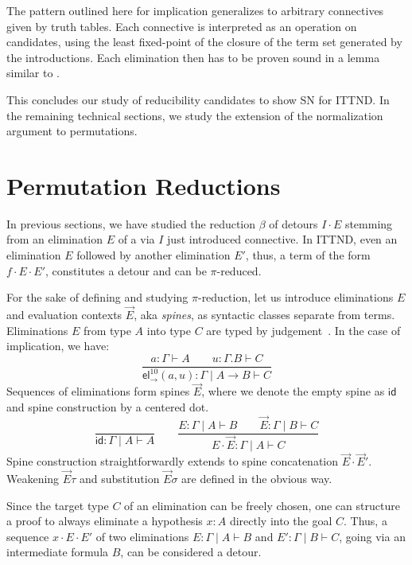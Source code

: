 \documentclass[a4paper,USenglish,cleveref, autoref, thm-restate]{lipics-v2019}
\newcommand{\tid}{\mathsf{id}}
\newcommand{\ru}{\dfrac}
\newcommand{\tel}{\mathsf{el}}
\newcommand{\el}[2]{\ensuremath{\tel_{#1}^{#2}}}
\begin{document}
The pattern outlined here for implication generalizes to arbitrary
connectives given by truth tables.  Each connective is interpreted as
an operation on candidates, using the least fixed-point of the closure
of the term set generated by the introductions.  Each elimination then
has to be proven sound in a lemma similar to .

This concludes our study of reducibility candidates to show SN for ITTND.
In the remaining technical
sections, we study the extension of the normalization argument to
permutations.

\section{Permutation Reductions}
\label{sec:perm}


In previous sections, we have studied the reduction $\beta$ of detours
$I \cdot E$
stemming from an elimination $E$ of a via $I$ just introduced connective.
%
In ITTND, even an elimination $E$ followed by another elimination
$E'$, thus, a term of the form $f \cdot E \cdot E'$, constitutes a
detour and can be $\pi$-reduced.

For the sake of defining and studying $\pi$-reduction, let us
introduce eliminations $E$ and evaluation contexts $\vec E$, aka
\emph{spines}, as syntactic classes separate from terms.  Eliminations
$E$ from type $A$ into type $C$ are typed by judgement
\,.  In the case of implication, we have:
\[
  \ru{a : \Gamma \vdash A \qquad u : \Gamma.B \vdash C
    }{\el\to{10}(a,u) : \Gamma \mid A \to B \vdash C}
\]
Sequences of eliminations form spines $\vec E$, where we
denote the empty spine as $\tid$ and spine construction by a
centered dot.
\[
  \ru{}{\tid : \Gamma \mid A \vdash A}
\qquad
  \ru{E : \Gamma \mid A \vdash B \qquad
      \vec E : \Gamma \mid B \vdash C
    }{E \cdot \vec E : \Gamma \mid A \vdash C}
\]
Spine construction straightforwardly extends to spine
concatenation $\vec E \cdot \vec E'$.
Weakening $\vec E \tau$ and substitution $\vec E \sigma$ are defined
in the obvious way.

Since the target type $C$ of an elimination can be freely chosen, one
can structure a proof to always eliminate a hypothesis $x : A$
directly into the goal $C$.
Thus, a sequence $x \cdot E \cdot E'$ of two eliminations
$E : \Gamma \mid A \vdash B$ and $E' : \Gamma \mid B \vdash C$, going via an
intermediate formula $B$, can be considered a detour.
\end{document}
